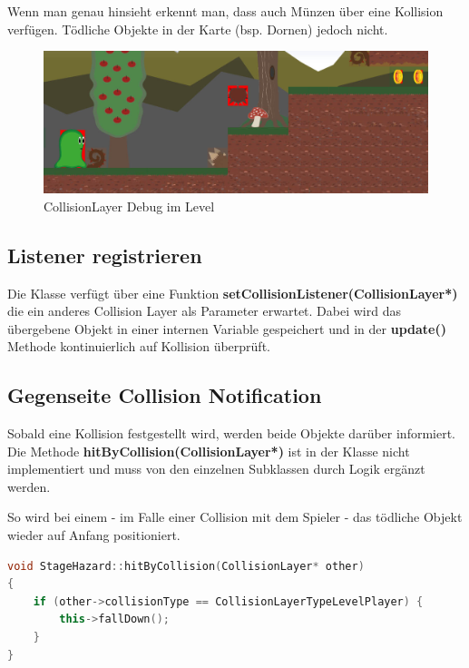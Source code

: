 Wenn man genau hinsieht erkennt man, dass auch Münzen über eine Kollision verfügen. Tödliche Objekte in der Karte (bsp. Dornen) jedoch nicht.

\begin{figure}[H]
  \centering
  \includegraphics[width=\textwidth - 50pt]{resources/CollisionLayer_Level}
  \caption{CollisionLayer Debug im Level}
  \label{fig:collision_debug_level} 
\end{figure}


\subsection{Listener registrieren}

Die Klasse verfügt über eine Funktion \textbf{setCollisionListener(CollisionLayer*)} die ein anderes Collision Layer als Parameter erwartet. Dabei wird das übergebene Objekt in einer internen Variable gespeichert und in der \textbf{update()} Methode kontinuierlich auf Kollision überprüft.

\subsection{Gegenseite Collision Notification}

Sobald eine Kollision festgestellt wird, werden beide Objekte darüber informiert. Die Methode \textbf{hitByCollision(CollisionLayer*)} ist in der  Klasse nicht implementiert und muss von den einzelnen Subklassen durch Logik ergänzt werden.

So wird bei einem  - im Falle einer Collision mit dem Spieler - das tödliche Objekt wieder auf Anfang positioniert.

\begin{lstlisting}[label=lst:hit_by_collision,
				   language=C++,
				   firstnumber=32,
				   caption=Collision Notification ( StageHazard.cpp )]
void StageHazard::hitByCollision(CollisionLayer* other)
{
	if (other->collisionType == CollisionLayerTypeLevelPlayer) {
		this->fallDown();
	}
}
\end{lstlisting}
